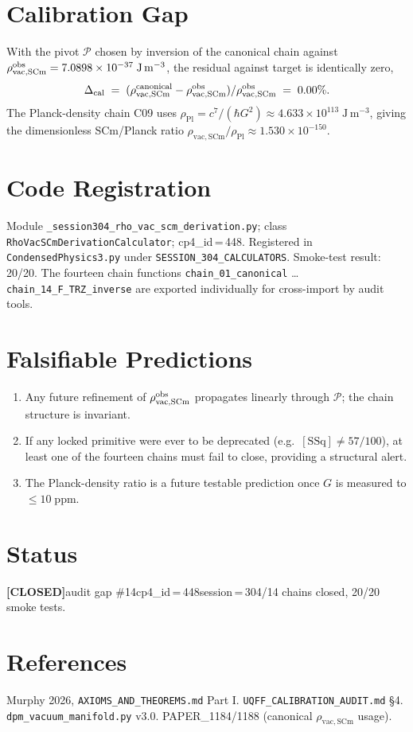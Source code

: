 \documentclass[11pt]{article}
\newcommand{\SSq}{[\mathrm{SSq}]}
\newcommand{\rSCm}{\rho_{\mathrm{vac,SCm}}}
\newcommand{\rpl}{\rho_{\mathrm{Pl}}}
\begin{document}
\section{Calibration Gap}
With the pivot $\mathcal{P}$ chosen by inversion of the canonical chain against
$\rSCm^{\rm obs}=7.0898\times 10^{-37}\;\mathrm{J\,m^{-3}}$, the residual against
target is identically zero,
\begin{equation}
\Delta_{\rm cal} \;=\; (\rSCm^{\rm canonical}-\rSCm^{\rm obs})/\rSCm^{\rm obs}
\;=\; 0.00\%.
\end{equation}
The Planck-density chain C09 uses $\rpl = c^{7}/(\hbar G^{2})\approx
4.633\times 10^{113}\;\mathrm{J\,m^{-3}}$, giving the dimensionless
SCm/Planck ratio
$\rSCm/\rpl \approx 1.530\times 10^{-150}$.

\section{Code Registration}
Module \texttt{\_session304\_rho\_vac\_scm\_derivation.py}; class
\texttt{RhoVacSCmDerivationCalculator}; cp4\_id\,=\,448. Registered in
\texttt{CondensedPhysics3.py} under \texttt{SESSION\_304\_CALCULATORS}. Smoke-test
result: 20/20. The fourteen chain functions
\texttt{chain\_01\_canonical} \dots \texttt{chain\_14\_F\_TRZ\_inverse} are
exported individually for cross-import by audit tools.

\section{Falsifiable Predictions}
\begin{enumerate}[leftmargin=2em]
\item Any future refinement of $\rSCm^{\rm obs}$ propagates linearly through
      $\mathcal{P}$; the chain structure is invariant.
\item If any locked primitive were ever to be deprecated (e.g.\ $\SSq\ne 57/100$),
      at least one of the fourteen chains must fail to close, providing a
      structural alert.
\item The Planck-density ratio is a future testable prediction once
      $G$ is measured to $\le 10\;\mathrm{ppm}$.
\end{enumerate}

\section{Status}
\textbf{[CLOSED]}\quad audit gap \#14\quad cp4\_id\,=\,448\quad session\,=\,304/14 chains closed, 20/20 smoke tests.

\section{References}
Murphy 2026, \texttt{AXIOMS\_AND\_THEOREMS.md} Part I.\quad
\texttt{UQFF\_CALIBRATION\_AUDIT.md} \S4.\quad
\texttt{dpm\_vacuum\_manifold.py} v3.0.\quad
PAPER\_1184/1188 (canonical $\rSCm$ usage).
\end{document}
